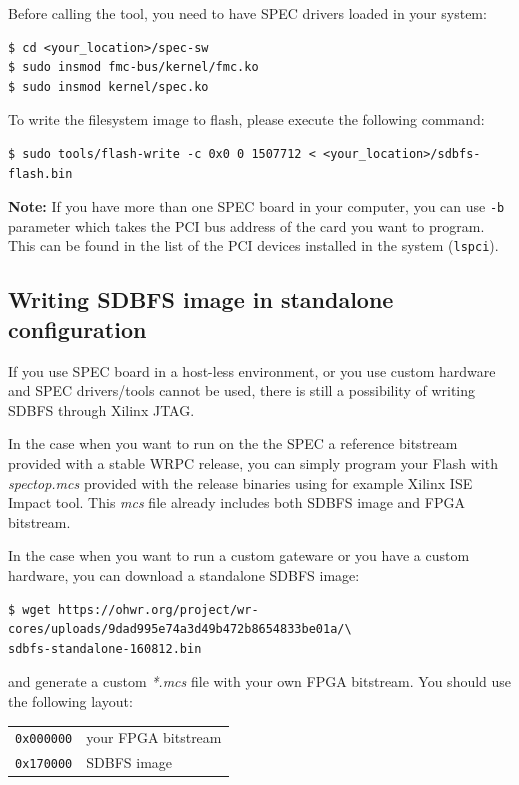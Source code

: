 \documentclass[a4paper, 12pt]{article}
\renewcommand{\_}{\underscore\allowbreak}
\newcommand{\code}[1]{\texttt{#1}}
\begin{document}
Before calling the tool, you need to have SPEC drivers loaded in your system:
\begin{lstlisting}
$ cd <your_location>/spec-sw
$ sudo insmod fmc-bus/kernel/fmc.ko
$ sudo insmod kernel/spec.ko
\end{lstlisting}

To write the filesystem image to flash, please execute the following
command:
\begin{lstlisting}
$ sudo tools/flash-write -c 0x0 0 1507712 < <your_location>/sdbfs-flash.bin
\end{lstlisting}

\noindent\textbf{Note:} If you have more than one SPEC board in your computer,
you can use \code{-b} parameter which takes the PCI bus address of the card you
want to program. This can be found in the list of the PCI devices installed in
the system (\code{lspci}).

\subsection{Writing SDBFS image in standalone configuration}

If you use SPEC board in a host-less environment, or you use custom
hardware and SPEC drivers/tools cannot be used, there is still a
possibility of writing SDBFS through Xilinx JTAG.

\vspace{1em}
In the case when you want to run on the the SPEC a reference bitstream provided with a stable
WRPC release, you can simply program your Flash with \textit{spec\_top.mcs}
provided with the release binaries using for example Xilinx ISE Impact tool.
This \textit{mcs} file already includes both SDBFS image and FPGA bitstream.

In the case when you want to run a custom gateware or you have a custom hardware, you can
download a standalone SDBFS image:
\begin{lstlisting}
$ wget https://ohwr.org/project/wr-cores/uploads/9dad995e74a3d49b472b8654833be01a/\
sdbfs-standalone-160812.bin
\end{lstlisting}
and generate a custom \textit{*.mcs} file with your own FPGA bitstream. You should
use the following layout:
\begin{longtable}{  l  l }
\code{0x000000} & your FPGA bitstream \\
\code{0x170000} & SDBFS image\\
\end{longtable}
\end{document}
